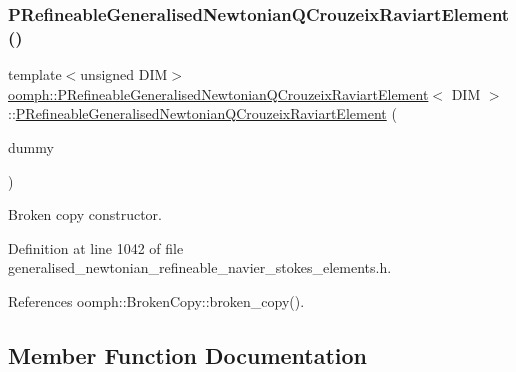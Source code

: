 \subsubsection{\texorpdfstring{P\+Refineable\+Generalised\+Newtonian\+Q\+Crouzeix\+Raviart\+Element()}{PRefineableGeneralisedNewtonianQCrouzeixRaviartElement()}\hspace{0.1cm}{\footnotesize\ttfamily [2/2]}}
{\footnotesize\ttfamily template$<$unsigned D\+IM$>$ \\
\hyperlink{classoomph_1_1PRefineableGeneralisedNewtonianQCrouzeixRaviartElement}{oomph\+::\+P\+Refineable\+Generalised\+Newtonian\+Q\+Crouzeix\+Raviart\+Element}$<$ D\+IM $>$\+::\hyperlink{classoomph_1_1PRefineableGeneralisedNewtonianQCrouzeixRaviartElement}{P\+Refineable\+Generalised\+Newtonian\+Q\+Crouzeix\+Raviart\+Element} (\begin{DoxyParamCaption}\item[{const \hyperlink{classoomph_1_1PRefineableGeneralisedNewtonianQCrouzeixRaviartElement}{P\+Refineable\+Generalised\+Newtonian\+Q\+Crouzeix\+Raviart\+Element}$<$ D\+IM $>$ \&}]{dummy }\end{DoxyParamCaption})\hspace{0.3cm}{\ttfamily [inline]}}



Broken copy constructor. 



Definition at line 1042 of file generalised\+\_\+newtonian\+\_\+refineable\+\_\+navier\+\_\+stokes\+\_\+elements.\+h.



References oomph\+::\+Broken\+Copy\+::broken\+\_\+copy().



\subsection{Member Function Documentation}
\mbox{\label{classoomph_1_1PRefineableGeneralisedNewtonianQCrouzeixRaviartElement_a203b2ab3f584e3283f793724b13f1838}} 
